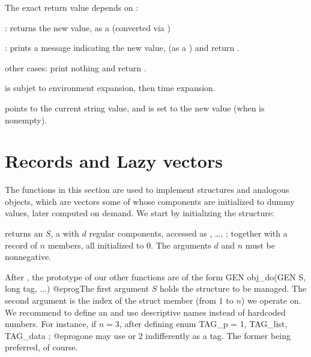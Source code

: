 The exact return value depends on :

\item {}: returns the new value, as a  (converted via
)

\item {}: prints a message indicating the new value,
(as a ) and return .

\item other cases: print nothing and return .

\item {} is subjet to environment expansion, then time expansion.

\item {} points to the current string value, and is set to the new
value (when  is nonempty).

\section{Records and Lazy vectors}
The functions in this section are used to implement  structures and
analogous objects, which are vectors some of whose components are initialized
to dummy values, later computed on demand. We start by initializing the
structure:

 returns an  $S$, a 
with $d$ regular components, accessed as , \dots,
; together with a record of $n$ members, all initialized to
$0$. The arguments $d$ and $n$ must be nonnegative.

After , the prototype of our other functions are of
the form
\bprog
  GEN obj_do(GEN S, long tag, ...)
@eprog\noindent The first argument $S$ holds the structure to be managed.
The second argument  is the index of the struct member (from $1$ to
$n$) we operate on. We recommend to define an  and use descriptive
names instead of hardcoded numbers. For instance, if $n = 3$, after defining
\bprog
  enum { TAG_p = 1, TAG_list, TAG_data };
@eprog\noindent one may use  or $2$ indifferently as a tag.
The former being preferred, of course.

